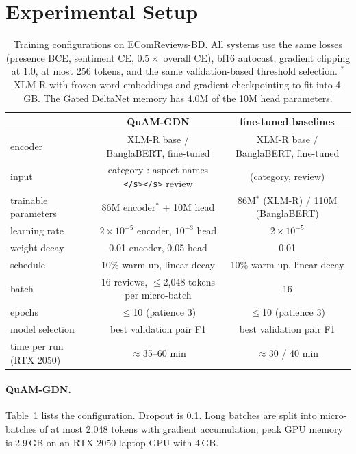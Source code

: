 \documentclass[11pt]{article}
\newcommand{\quam}{QuAM-GDN}
\begin{document}
\section{Experimental Setup}
\label{sec:setup}

\begin{table}[t]
\centering\small
\begin{tabular}{lcc}
\toprule
 & \quam{} & fine-tuned baselines \\
\midrule
encoder & XLM-R base / BanglaBERT, fine-tuned & XLM-R base / BanglaBERT, fine-tuned \\
input & category : aspect names \texttt{</s></s>} review & (category, review) \\
trainable parameters & 86M encoder$^\ast$ + 10M head & 86M$^\ast$ (XLM-R) / 110M (BanglaBERT) \\
learning rate & $2\times10^{-5}$ encoder, $10^{-3}$ head & $2\times10^{-5}$ \\
weight decay & 0.01 encoder, 0.05 head & 0.01 \\
schedule & 10\% warm-up, linear decay & 10\% warm-up, linear decay \\
batch & 16 reviews, $\leq$2,048 tokens per micro-batch & 16 \\
epochs & $\leq$10 (patience 3) & $\leq$10 (patience 3) \\
model selection & best validation pair F1 & best validation pair F1 \\
time per run (RTX 2050) & $\approx$35--60 min & $\approx$30 / 40 min \\
\bottomrule
\end{tabular}
\caption{Training configurations on EComReviews-BD. All systems use the same losses (presence BCE,
sentiment CE, $0.5\times$ overall CE), bf16 autocast, gradient clipping at 1.0, at most 256 tokens,
and the same validation-based threshold selection. $^\ast$XLM-R with frozen word embeddings and
gradient checkpointing to fit into 4\,GB. The Gated DeltaNet memory has 4.0M of the 10M head
parameters.}
\label{tab:setup}
\end{table}

\paragraph{\quam{}.} Table~\ref{tab:setup} lists the configuration. Dropout is 0.1. Long batches are
split into micro-batches of at most 2,048 tokens with gradient accumulation; peak GPU memory is
2.9\,GB on an RTX 2050 laptop GPU with 4\,GB.
\end{document}
